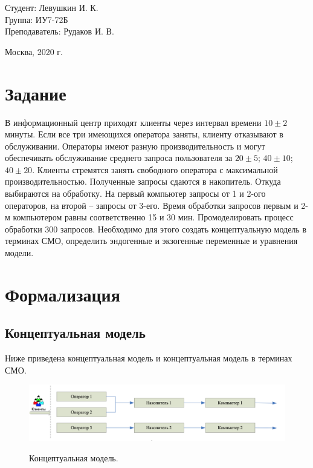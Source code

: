 \documentclass[a4paper,12pt]{article}
\begin{document}
	\large
	\begin{flushright}
		Студент: Левушкин И. К. \\
		Группа: ИУ7-72Б \\
		Преподаватель: Рудаков И. В. \\
	\end{flushright}
	
	\vspace*{25mm}
	\begin{center}
		Москва, 2020 г.  
	\end{center}
	\thispagestyle{empty}
	
	
	\newpage
	
	\section*{Задание}
	
	В информационный центр приходят клиенты через интервал времени $10 \pm 2$ минуты. Если все три имеющихся оператора заняты, клиенту отказывают в обслуживании. Операторы имеют разную производительность и могут обеспечивать обслуживание среднего запроса пользователя за $20 \pm 5$; $40 \pm 10$; $40 \pm 20$. Клиенты стремятся занять свободного оператора с максимальной производительностью. Полученные запросы сдаются в накопитель. Откуда выбираются на обработку. На первый компьютер запросы от 1 и 2-ого операторов, на второй – запросы от 3-его. Время обработки запросов первым и 2-м компьютером равны соответственно 15 и 30 мин. Промоделировать процесс обработки 300 запросов. 
	Необходимо для этого создать концептуальную модель в терминах СМО, определить эндогенные и экзогенные переменные и уравнения модели.
	
	\newpage
	
	\section*{Формализация}
	
	\subsection*{Концептуальная модель}
	
	Ниже приведена концептуальная модель и концептуальная модель в терминах СМО.
	
	\begin{figure}[h!]
		\begin{center}
			{\includegraphics[scale = 0.6]{model1.png}}
			\label{ris:model1}
		\end{center}
		\caption{Концептуальная модель.}
	\end{figure}
	
\end{document}
